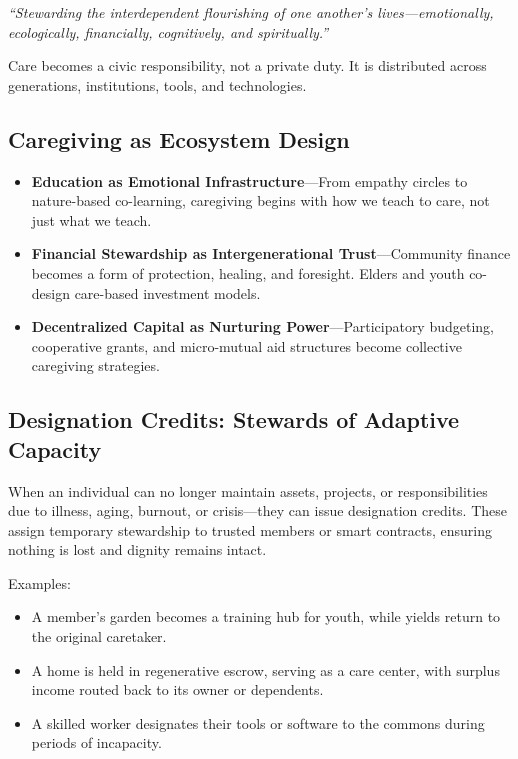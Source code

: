 \documentclass[12pt]{article}
\begin{document}
\textit{“Stewarding the interdependent flourishing of one another’s lives—emotionally, ecologically, financially, cognitively, and spiritually.”}

Care becomes a civic responsibility, not a private duty. It is distributed across generations, institutions, tools, and technologies.

\subsection*{Caregiving as Ecosystem Design}

\begin{itemize}
    \item \textbf{Education as Emotional Infrastructure}—From empathy circles to nature-based co-learning, caregiving begins with how we teach to care, not just what we teach.
    \item \textbf{Financial Stewardship as Intergenerational Trust}—Community finance becomes a form of protection, healing, and foresight. Elders and youth co-design care-based investment models.
    \item \textbf{Decentralized Capital as Nurturing Power}—Participatory budgeting, cooperative grants, and micro-mutual aid structures become collective caregiving strategies.
\end{itemize}

\subsection*{Designation Credits: Stewards of Adaptive Capacity}

When an individual can no longer maintain assets, projects, or responsibilities due to illness, aging, burnout, or crisis—they can issue designation credits. These assign temporary stewardship to trusted members or smart contracts, ensuring nothing is lost and dignity remains intact.

Examples:
\begin{itemize}
    \item A member’s garden becomes a training hub for youth, while yields return to the original caretaker.
    \item A home is held in regenerative escrow, serving as a care center, with surplus income routed back to its owner or dependents.
    \item A skilled worker designates their tools or software to the commons during periods of incapacity.
\end{itemize}
\end{document}
